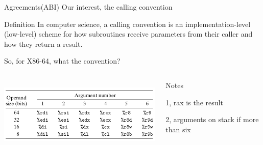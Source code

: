 \documentclass[UKenglish]{beamer}
\begin{document}
\begin{frame}{Agreements(ABI)}
Our interest, the calling convention
\begin{alertblock}{Definition}
In computer science, a calling convention is an implementation-level (low-level) scheme
for how subroutines receive parameters from their caller and how they return a result.
\end{alertblock}
\begin{center}
  So, for X86-64, what the convention?
  \begin{columns}[onlytextwidth]
    \begin{column}{0.45\textwidth}
          \begin{minipage}[c][0.56\textheight][c]{\linewidth} 
          \includegraphics[width = 1\textwidth, height=3.5cm]{param.png}
          \end{minipage}
    \end{column}
    \begin{column}{0.5\textwidth}
      \begin{minipage}[c][0.55\textheight][c]{1\linewidth}
        \begin{block}{Notes}
        \item 1, rax is the result
        \item 2, arguments on stack if more than six
        \end{block}
      \end{minipage}
      
       \end{column}
     \end{columns}
\end{center}

\end{frame}
\end{document}
